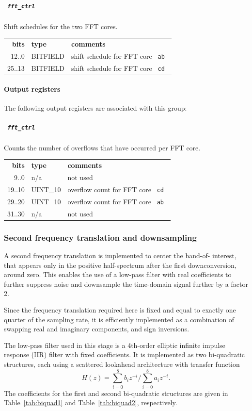 \documentclass[a4paper,10pt]{article}
\newcommand{\tabref}[1]{Table~\ref{#1}}
\newcommand{\ilcode}[1]{\begingroup
	\setlength{\fboxsep}{1pt}\colorbox{ilcodebg}{\small\tt%
		#1%
	}\endgroup}
\begin{document}
\subparagraph{\ilcode{fft\_ctrl}}
Shift schedules for the two FFT cores.\\
\begin{tabular}{rll}
	{\bf bits} & {\bf type} & {\bf comments}\\
	  12..0 & BITFIELD & shift schedule for FFT core \ilcode{ab}\\
	 25..13 & BITFIELD & shift schedule for FFT core \ilcode{cd}
\end{tabular}

\paragraph{Output registers}
The following output registers are associated with this group:

\subparagraph{\ilcode{fft\_ctrl}}
Counts the number of overflows that have occurred per FFT core.\\
\begin{tabular}{rll}
	{\bf bits} & {\bf type} & {\bf comments}\\
	   9..0 & n/a      & not used\\
	 19..10 & UINT\_10 & overflow count for  FFT core \ilcode{cd}\\
	 29..20 & UINT\_10 & overflow count for  FFT core \ilcode{ab}\\
	 31..30 & n/a      & not used
\end{tabular}

\subsubsection{Second frequency translation and downsampling}
\label{sec:gwdcpddc2}
A second frequency translation is implemented to center the band-of-
interest, that appears only in the positive half-spectrum after the 
first downconversion, around zero. This enables the use of a low-pass 
filter with real coefficients to further suppress noise and downsample 
the time-domain signal further by a factor 2.

Since the frequency translation required here is fixed and equal to 
exactly one quarter of the sampling rate, it is efficiently implemented
as a combination of swapping real and imaginary components, and sign 
inversions.

The low-pass filter used in this stage is a 4th-order elliptic infinite 
impulse response (IIR) filter with fixed coefficients. It is implemented 
as two bi-quadratic structures, each using a scattered lookahead 
architecture with transfer function
\begin{equation}
	H(z) = \sum_{i=0}^{8} b_{i}z^{-i} \bigg/ \sum_{i=0}^{8}a_{i}z^{-i}.
\end{equation}
The coefficients for the first and second bi-quadratic structures are 
given in \tabref{tab:biquad1} and \tabref{tab:biquad2}, respectively.
\end{document}

